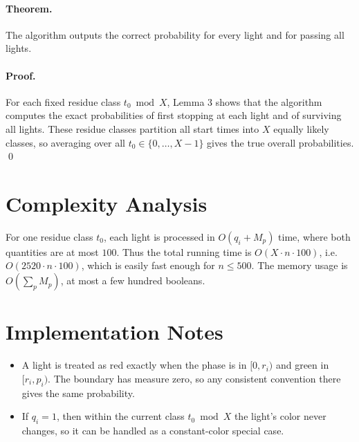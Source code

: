 \documentclass[11pt]{article}
\begin{document}
\paragraph{Theorem.}
The algorithm outputs the correct probability for every light and for passing all lights.

\paragraph{Proof.}
For each fixed residue class $t_0 \bmod X$, Lemma 3 shows that the algorithm computes the exact
probabilities of first stopping at each light and of surviving all lights.
These residue classes partition all start times into $X$ equally likely classes, so averaging over all
$t_0 \in \{0,\dots,X-1\}$ gives the true overall probabilities. \qed

\section*{Complexity Analysis}

For one residue class $t_0$, each light is processed in $O(q_i + M_p)$ time, where both quantities are
at most $100$.
Thus the total running time is $O(X \cdot n \cdot 100)$, i.e.\ $O(2520 \cdot n \cdot 100)$, which is easily
fast enough for $n \le 500$.
The memory usage is $O(\sum_p M_p)$, at most a few hundred booleans.

\section*{Implementation Notes}

\begin{itemize}[leftmargin=*]
    \item A light is treated as red exactly when the phase is in $[0, r_i)$ and green in $[r_i, p_i)$.
    The boundary has measure zero, so any consistent convention there gives the same probability.
    \item If $q_i = 1$, then within the current class $t_0 \bmod X$ the light's color never changes,
    so it can be handled as a constant-color special case.
\end{itemize}
\end{document}
